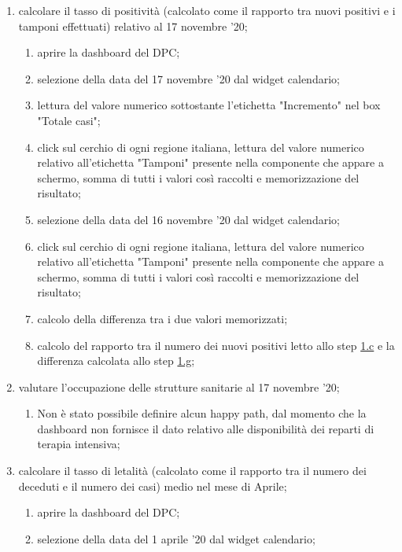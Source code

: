 \begin{enumerate}
    \item calcolare il tasso di positività (calcolato come il rapporto tra nuovi positivi e i tamponi effettuati) relativo al 17 novembre '20;    
    \begin{enumerate}[label=\alph*.]
        \item aprire la dashboard del DPC;
        \item selezione della data del 17 novembre '20 dal widget calendario;
        \item lettura del valore numerico sottostante l'etichetta "Incremento" nel box "Totale casi";\label{ta:c}
        \item click sul cerchio di ogni regione italiana, lettura del valore numerico relativo all'etichetta "Tamponi" presente nella componente che appare a schermo, somma di tutti i valori così raccolti e memorizzazione del risultato;
        \item selezione della data del 16 novembre '20 dal widget calendario;
        \item click sul cerchio di ogni regione italiana, lettura del valore numerico relativo all'etichetta "Tamponi" presente nella componente che appare a schermo, somma di tutti i valori così raccolti e memorizzazione del risultato;
        \item calcolo della differenza tra i due valori memorizzati;\label{ta:g}
        \item calcolo del rapporto tra il numero dei nuovi positivi letto allo step \hyperref[ta:c]{1.c} e la differenza calcolata allo step \hyperref[ta:g]{1.g};
    \end{enumerate}
    \item valutare l'occupazione delle strutture sanitarie al 17 novembre '20;
    \begin{enumerate}[label=\alph*.]
        \item  Non è stato possibile definire alcun happy path, dal momento che la dashboard non fornisce il dato relativo alle disponibilità dei reparti di terapia intensiva;
    \end{enumerate}
    \item calcolare il tasso di letalità (calcolato come il rapporto tra il numero dei deceduti e il numero dei casi) medio nel mese di Aprile;
    \begin{enumerate}[label=\alph*.]
        \item aprire la dashboard del DPC;
        \item selezione della data del 1 aprile '20 dal widget calendario;

\end{enumerate}
\end{enumerate}
